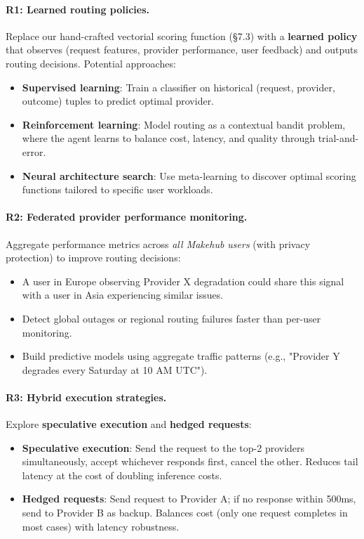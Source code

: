 \documentclass[english]{article}
\begin{document}
\paragraph{R1: Learned routing policies.}

Replace our hand-crafted vectorial scoring function (§7.3) with a \textbf{learned policy} that observes (request features, provider performance, user feedback) and outputs routing decisions. Potential approaches:
\begin{itemize}
    \item \textbf{Supervised learning}: Train a classifier on historical (request, provider, outcome) tuples to predict optimal provider.
    \item \textbf{Reinforcement learning}: Model routing as a contextual bandit problem, where the agent learns to balance cost, latency, and quality through trial-and-error.
    \item \textbf{Neural architecture search}: Use meta-learning to discover optimal scoring functions tailored to specific user workloads.
\end{itemize}

\paragraph{R2: Federated provider performance monitoring.}

Aggregate performance metrics across \emph{all Makehub users} (with privacy protection) to improve routing decisions:
\begin{itemize}
    \item A user in Europe observing Provider X degradation could share this signal with a user in Asia experiencing similar issues.
    \item Detect global outages or regional routing failures faster than per-user monitoring.
    \item Build predictive models using aggregate traffic patterns (e.g., "Provider Y degrades every Saturday at 10 AM UTC").
\end{itemize}

\paragraph{R3: Hybrid execution strategies.}

Explore \textbf{speculative execution} and \textbf{hedged requests}:
\begin{itemize}
    \item \textbf{Speculative execution}: Send the request to the top-2 providers simultaneously, accept whichever responds first, cancel the other. Reduces tail latency at the cost of doubling inference costs.
    \item \textbf{Hedged requests}: Send request to Provider A; if no response within 500ms, send to Provider B as backup. Balances cost (only one request completes in most cases) with latency robustness.
\end{itemize}
\end{document}
